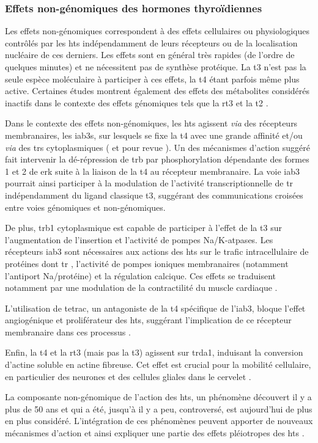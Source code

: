 \documentclass[../main.tex]{subfiles}
\begin{document}
		\subsubsection{Effets non-génomiques des hormones thyroïdiennes}
			Les effets non-génomiques correspondent à des effets cellulaires ou physiologiques contrôlés par les \glspl{ht} indépendamment de leurs récepteurs ou de la localisation nucléaire de ces derniers.
			Les effets sont en général très rapides (de l'ordre de quelques minutes) et ne nécessitent pas de synthèse protéique.
			La \gls{t3} n'est pas la seule espèce moléculaire à participer à ces effets, la \gls{t4} étant parfois même plus active.
			Certaines études montrent également des effets des métabolites considérés inactifs dans le contexte des effets génomiques tels que la \gls{rt3} \citep{Siegrist-Kaiser1990} et la \gls{t2} \citep{Lombardi1998}.
			\par
			Dans le contexte des effets non-génomiques, les \glspl{ht} agissent \textit{via} des récepteurs membranaires, les \glspl{iab3}, sur lesquels se fixe la \gls{t4} avec une grande affinité et/ou \textit{via} des \glspl{tr} cytoplasmiques (\citealp{Bergh2005} et pour revue \citealp{Davis2008}).
			Un des mécanismes d'action suggéré fait intervenir la dé-répression de \gls{trb} par phosphorylation dépendante des formes 1 et 2 de \gls{erk} \citep{Davis2000} suite à la liaison de la \gls{t4} au récepteur membranaire.
			La voie \gls{iab3} pourrait ainsi participer à la modulation de l'activité transcriptionnelle de \gls{tr} indépendamment du ligand classique \gls{t3}, suggérant des communications croisées entre voies génomiques et non-génomiques.
			\par
			De plus, \gls{trb}1 cytoplasmique est capable de participer à l'effet de la \gls{t3} sur l'augmentation de l'insertion et l'activité de pompes \gls{Na}/\gls{K}-\gls{atp}ases.
			Les récepteurs \gls{iab3} sont nécessaires aux actions des \glspl{ht} sur le trafic intracellulaire de protéines dont \gls{tr} \citep{Davis2005}, l'activité de pompes ioniques membranaires (notamment l'antiport \gls{Na}/protéine) et la régulation calcique.
			Ces effets se traduisent notamment par une modulation de la contractilité du muscle cardiaque \citep{Davis2002}.
			\par
			L'utilisation de \gls{tetrac}, un antagoniste de la \gls{t4} spécifique de l'\gls{iab3}, bloque l'effet angiogénique et proliférateur des \glspl{ht}, suggérant l'implication de ce récepteur membranaire dans ces processus \citep{Davis2011}.
			\par
			Enfin, la \gls{t4} et la \gls{rt3} (mais pas la \gls{t3}) agissent sur \gls{trda}1, induisant la conversion d'actine soluble en actine fibreuse.
			Cet effet est crucial pour la mobilité cellulaire, en particulier des neurones et des cellules gliales dans le cervelet \citep{Safran1993,Leonard2006}.
			\par
			La composante non-génomique de l'action des \glspl{ht}, un phénomène découvert il y a plus de 50 ans et qui a été, jusqu'à il y a peu, controversé, est aujourd'hui de plus en plus considéré.
			L'intégration de ces phénomènes peuvent apporter de nouveaux mécanismes d'action et ainsi expliquer une partie des effets pléiotropes des \glspl{ht} \citep{Brix2011}.
\end{document}
